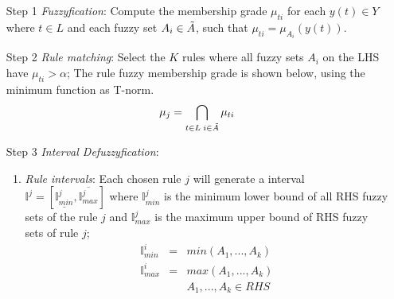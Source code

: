 \begin{enumerate}
\item [Step 1] \textit{Fuzzyfication}: Compute the membership grade $\mu_{ti}$ for each $y(t) \in Y$ where $t \in L$ and each fuzzy set $A_i \in \Tilde{A}$, such that $\mu_{ti} = \mu_{A_i}(y(t))$. 
\item [Step 2] \textit{Rule matching}: Select the $K$ rules where all fuzzy sets $A_i$ on the LHS have $\mu_{ti} > \alpha$; The rule fuzzy membership grade is shown below, using the minimum function as T-norm.
\begin{equation}
    \mu_j = \bigcap_{t\in L\; i \in \Tilde{A}} \mu_{ti}
\end{equation}

\item [Step 3] \textit{Interval Defuzzyfication}:
\begin{enumerate}
\item \textit{Rule intervals}: Each chosen rule $j$ will generate a interval $\mathbb{I}^j = [\underline{\mathbb{I}^j_{min}}, \overline{\mathbb{I}^j_{max}}]$ where $\mathbb{I}^j_{min}$ is the minimum lower bound of all RHS fuzzy sets of the rule $j$ and $\mathbb{I}^j_{max}$ is the maximum upper bound of RHS fuzzy sets of rule $j$;
\begin{equation}
\begin{array}{lcr}
\mathbb{I}^i_{min} & = & min( A_1, ..., A_k ) \\
\mathbb{I}^i_{max} & = & max( A_1, ..., A_k ) \\ 
& & A_1, ..., A_k \in RHS 
\end{array}
\label{eqn:iminimax}
\end{equation}


\end{enumerate}
\end{enumerate}
